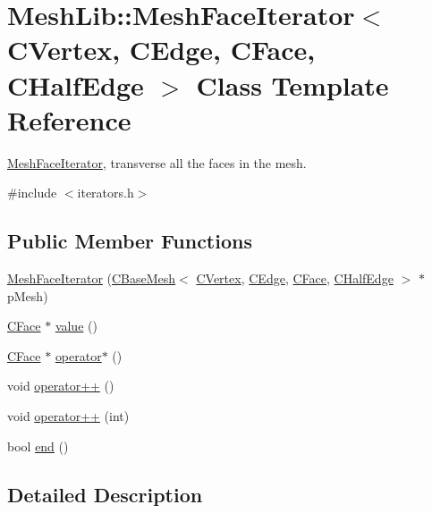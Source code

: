 \hypertarget{class_mesh_lib_1_1_mesh_face_iterator}{}\section{Mesh\+Lib\+:\+:Mesh\+Face\+Iterator$<$ C\+Vertex, C\+Edge, C\+Face, C\+Half\+Edge $>$ Class Template Reference}
\label{class_mesh_lib_1_1_mesh_face_iterator}


\hyperlink{class_mesh_lib_1_1_mesh_face_iterator}{Mesh\+Face\+Iterator}, transverse all the faces in the mesh.  




{\ttfamily \#include $<$iterators.\+h$>$}

\subsection*{Public Member Functions}
\begin{DoxyCompactItemize}
\item 
\hyperlink{class_mesh_lib_1_1_mesh_face_iterator_a75ba88fe7420c603fc053cef894ba5cb}{Mesh\+Face\+Iterator} (\hyperlink{class_mesh_lib_1_1_c_base_mesh}{C\+Base\+Mesh}$<$ \hyperlink{class_mesh_lib_1_1_c_vertex}{C\+Vertex}, \hyperlink{class_mesh_lib_1_1_c_edge}{C\+Edge}, \hyperlink{class_mesh_lib_1_1_c_face}{C\+Face}, \hyperlink{class_mesh_lib_1_1_c_half_edge}{C\+Half\+Edge} $>$ $\ast$p\+Mesh)
\item 
\hyperlink{class_mesh_lib_1_1_c_face}{C\+Face} $\ast$ \hyperlink{class_mesh_lib_1_1_mesh_face_iterator_ad8e65ff2835d4b51a30e27315c13f329}{value} ()
\item 
\hyperlink{class_mesh_lib_1_1_c_face}{C\+Face} $\ast$ \hyperlink{class_mesh_lib_1_1_mesh_face_iterator_aeef1e086cb0554c846acde340b9d1963}{operator$\ast$} ()
\item 
void \hyperlink{class_mesh_lib_1_1_mesh_face_iterator_a9a635ed69eb41275dc35ac94f4b2d565}{operator++} ()
\item 
void \hyperlink{class_mesh_lib_1_1_mesh_face_iterator_a3ad360fad7ebcfff235a7b9703fe4038}{operator++} (int)
\item 
bool \hyperlink{class_mesh_lib_1_1_mesh_face_iterator_a29b22ca0410e8b3d12fb0497a39c6f26}{end} ()
\end{DoxyCompactItemize}


\subsection{Detailed Description}
